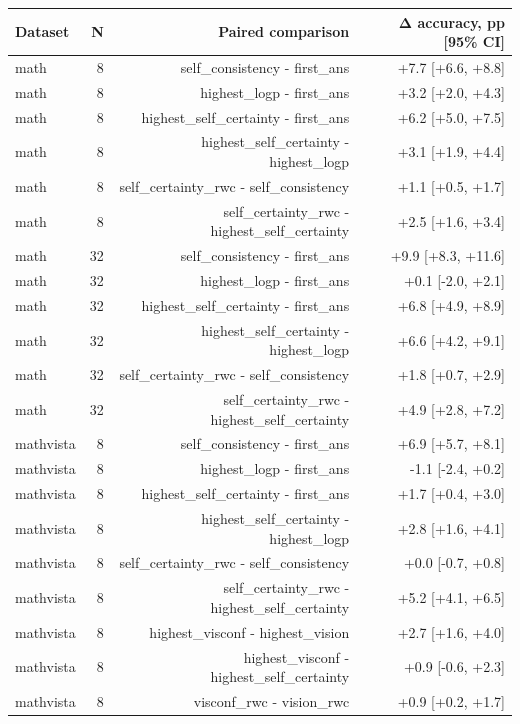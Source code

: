 \begin{table}[t]
\centering\small
\begin{tabular}{lrrr}
\toprule
Dataset & N & Paired comparison & Δ accuracy, pp [95\% CI] \\
\midrule
math & 8 & self\_consistency - first\_ans & +7.7 [+6.6, +8.8] \\
math & 8 & highest\_logp - first\_ans & +3.2 [+2.0, +4.3] \\
math & 8 & highest\_self\_certainty - first\_ans & +6.2 [+5.0, +7.5] \\
math & 8 & highest\_self\_certainty - highest\_logp & +3.1 [+1.9, +4.4] \\
math & 8 & self\_certainty\_rwc - self\_consistency & +1.1 [+0.5, +1.7] \\
math & 8 & self\_certainty\_rwc - highest\_self\_certainty & +2.5 [+1.6, +3.4] \\
math & 32 & self\_consistency - first\_ans & +9.9 [+8.3, +11.6] \\
math & 32 & highest\_logp - first\_ans & +0.1 [-2.0, +2.1] \\
math & 32 & highest\_self\_certainty - first\_ans & +6.8 [+4.9, +8.9] \\
math & 32 & highest\_self\_certainty - highest\_logp & +6.6 [+4.2, +9.1] \\
math & 32 & self\_certainty\_rwc - self\_consistency & +1.8 [+0.7, +2.9] \\
math & 32 & self\_certainty\_rwc - highest\_self\_certainty & +4.9 [+2.8, +7.2] \\
mathvista & 8 & self\_consistency - first\_ans & +6.9 [+5.7, +8.1] \\
mathvista & 8 & highest\_logp - first\_ans & -1.1 [-2.4, +0.2] \\
mathvista & 8 & highest\_self\_certainty - first\_ans & +1.7 [+0.4, +3.0] \\
mathvista & 8 & highest\_self\_certainty - highest\_logp & +2.8 [+1.6, +4.1] \\
mathvista & 8 & self\_certainty\_rwc - self\_consistency & +0.0 [-0.7, +0.8] \\
mathvista & 8 & self\_certainty\_rwc - highest\_self\_certainty & +5.2 [+4.1, +6.5] \\
mathvista & 8 & highest\_visconf - highest\_vision & +2.7 [+1.6, +4.0] \\
mathvista & 8 & highest\_visconf - highest\_self\_certainty & +0.9 [-0.6, +2.3] \\
mathvista & 8 & visconf\_rwc - vision\_rwc & +0.9 [+0.2, +1.7] \\

\end{tabular}
\end{table}
